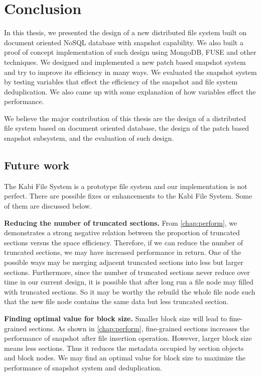 \chapter{Conclusion}
\label{chap:conclusion}

    In this thesis, we presented the design of a new distributed file system built on document oriented NoSQL database with snapshot capability. We also built a proof of concept implementation of such design using MongoDB, FUSE and other techniques. We designed and implemented a new patch based snapshot system and try to improve its efficiency in many ways. We evaluated the snapshot system by testing variables that effect the efficiency of the snapshot and file system deduplication. We also came up with some explanation of how variables effect the performance.

    We believe the major contribution of this thesis are the design of a distributed file system based on document oriented database, the design of the patch based snapshot subsystem, and the evaluation of such design.

\section{Future work}

    The Kabi File System is a prototype file system and our implementation is not perfect. There are possible fixes or enhancements to the Kabi File System. Some of them are discussed below.    

    \textbf{Reducing the number of truncated sections.} From \cref{chap:perform}, we demonstrates a strong negative relation between the proportion of truncated sections versus the space efficiency. Therefore, if we can reduce the number of truncated sections, we may have increased performance in return. One of the possible ways may be merging adjacent truncated sections into less but larger sections. Furthermore, since the number of truncated sections never reduce over time in our current design, it is possible that after long run a file node may filled with truncated sections. So it may be worthy the rebuild the whole file node such that the new file node contains the same data but less truncated section.
    
    \textbf{Finding optimal value for block size.} Smaller block size will lead to fine-grained sections. As shown in \cref{chap:perform}, fine-grained sections increases the performance of snapshot after file insertion operation. However, larger block size means less sections. Thus it reduces the metadata occupied by section objects and block nodes. We may find an optimal value for block size to maximize the performance of snapshot system and deduplication.

